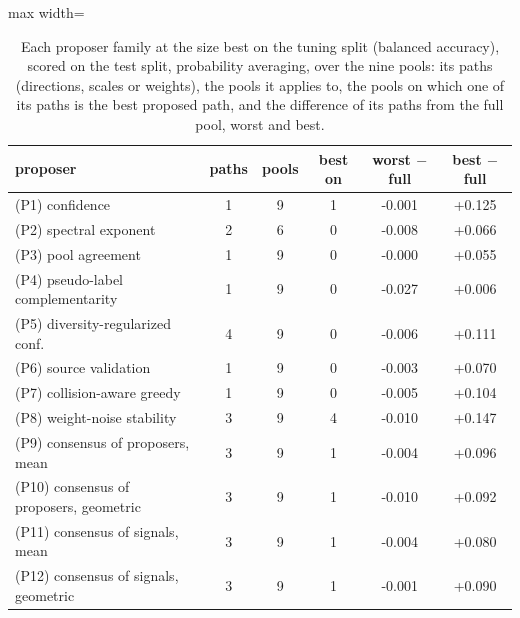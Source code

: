 \begin{table}[t]
\centering
\footnotesize
\caption{Each proposer family at the size best on the tuning split (balanced accuracy), scored on the test split, probability averaging, over the nine pools: its paths (directions, scales or weights), the pools it applies to, the pools on which one of its paths is the best proposed path, and the difference of its paths from the full pool, worst and best.}
\label{tab:proposers}
\setlength{\tabcolsep}{4pt}\begin{adjustbox}{max width=\linewidth}
\begin{tabular}{lccccc}
\toprule
proposer & paths & pools & best on & worst $-$ full & best $-$ full \\
\midrule
(P1) confidence & 1 & 9 & 1 & -0.001 & +0.125 \\
(P2) spectral exponent & 2 & 6 & 0 & -0.008 & +0.066 \\
(P3) pool agreement & 1 & 9 & 0 & -0.000 & +0.055 \\
(P4) pseudo-label complementarity & 1 & 9 & 0 & -0.027 & +0.006 \\
(P5) diversity-regularized conf. & 4 & 9 & 0 & -0.006 & +0.111 \\
(P6) source validation & 1 & 9 & 0 & -0.003 & +0.070 \\
(P7) collision-aware greedy & 1 & 9 & 0 & -0.005 & +0.104 \\
(P8) weight-noise stability & 3 & 9 & 4 & -0.010 & +0.147 \\
(P9) consensus of proposers, mean & 3 & 9 & 1 & -0.004 & +0.096 \\
(P10) consensus of proposers, geometric & 3 & 9 & 1 & -0.010 & +0.092 \\
(P11) consensus of signals, mean & 3 & 9 & 1 & -0.004 & +0.080 \\
(P12) consensus of signals, geometric & 3 & 9 & 1 & -0.001 & +0.090 \\
\bottomrule
\end{tabular}
\end{adjustbox}
\end{table}
